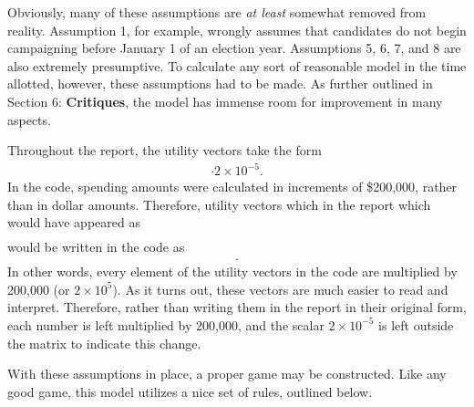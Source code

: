 \documentclass[11pt]{article}
\begin{document}
Obviously, many of these assumptions are \textit{at least} somewhat removed from
reality. Assumption 1, for example, wrongly assumes that candidates do not
begin campaigning before January 1 of an election year. Assumptions 5, 6, 7, and 8
are also extremely presumptive. To calculate any sort of reasonable
model in the time allotted, however, these assumptions had to be made. As further
outlined in Section 6: \textbf{Critiques}, the model has immense room for
improvement in many aspects.

Throughout the report, the utility vectors take the form 
\begin{align*}
[a, b, c, d] \cdot 2\times 10^{-5}.
\end{align*}
In the code, spending amounts were calculated in increments of \$200,000, rather than in dollar amounts. Therefore, utility vectors which in the report which would have appeared as 
\begin{align*}
[0.00001242, 0.00000143, -0.00001119, 0.00003519] 
\end{align*}
would be written in the code as 
\begin{align*}
[2.484, 0.286, -2.238, 7.038].
\end{align*}
In other words, every element of the utility vectors in the code are multiplied by 200,000 (or $2 \times 10^{5}$). As it turns out, these vectors are much easier to read and interpret. Therefore, rather than writing them in the report in their original form, each number is left multiplied by 200,000, and the scalar $2 \times 10^{-5}$ is left outside the matrix to indicate this change.

With these assumptions in place, a proper game may be constructed. Like any
good game, this model utilizes a nice set of rules, outlined below.
\end{document}
